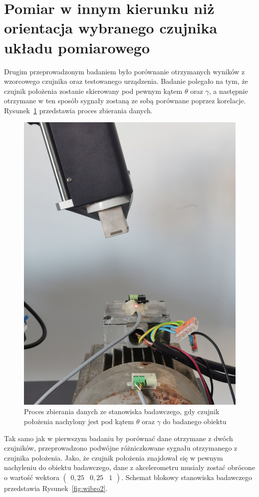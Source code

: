 \documentclass[a4paper, 12pt]{mwart}
\begin{document}
\section{Pomiar w innym kierunku niż orientacja wybranego czujnika układu pomiarowego}
Drugim przeprowadzonym badaniem było porównanie otrzymanych wyników z wzorcowego czujnika oraz testowanego urządzenia. Badanie polegało na tym, że czujnik położenia zostanie skierowany pod pewnym kątem $\theta$ oraz $\gamma$, a następnie otrzymane w ten sposób sygnały zostaną ze sobą porównane poprzez korelacje. Rysunek~\ref{fig:img20221108124849} przedstawia proces zbierania danych.
\begin{figure}[h!]
	\centering
	\includegraphics[width=0.6\linewidth]{assets/IMG_20221108_124849}
	\caption{Proces zbierania danych ze stanowiska badawczego, gdy czujnik położenia nachylony jest pod kątem $\theta$ oraz $\gamma$ do badanego obiektu}
	\label{fig:img20221108124849}
\end{figure}

Tak samo jak w pierwszym badaniu by porównać dane otrzymane z dwóch czujników, przeprowadzono podwójne różniczkowane sygnału otrzymanego z czujnika położenia. Jako, że czujnik położenia znajdował się w pewnym nachyleniu do obiektu badawczego, dane z akcelerometru musiały zostać obrócone o wartość wektora $ \begin{pmatrix}0,25 & 0,25 & 1\end{pmatrix} $. Schemat blokowy stanowiska badawczego przedstawia Rysunek~\ref{fig:wibro2}.
\end{document}
